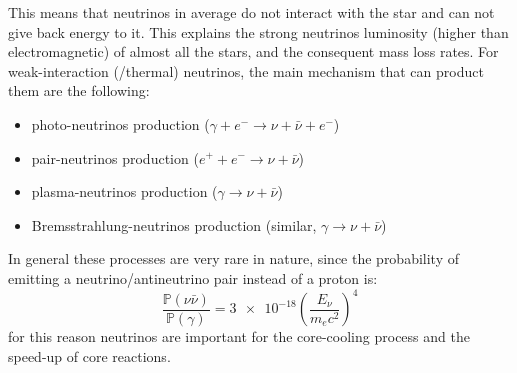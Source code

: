 \documentclass[main.tex]{subfiles}
\begin{document}
This means that neutrinos in average do not interact with the star and can not give back energy to it. This explains the strong neutrinos luminosity (higher than electromagnetic) of almost all the stars, and the consequent mass loss rates.
For weak-interaction (/thermal) neutrinos, the main mechanism that can product them are the following:
\begin{itemize}
    \item photo-neutrinos production ($\gamma+e^- \to \nu + \bar\nu +e^-$)
    \item pair-neutrinos production ($e^++e^- \to \nu + \bar\nu $)
    \item plasma-neutrinos production ($\gamma \to \nu + \bar\nu $)
    \item Bremsstrahlung-neutrinos production (similar, $\gamma \to \nu + \bar\nu $)
\end{itemize}

In general these processes are very rare in nature, since the probability of emitting a neutrino/antineutrino pair instead of a proton is:
%
\begin{equation}
    \frac{\mathbb{P}(\nu\bar\nu)}{\mathbb{P}(\gamma)}=\num{3e-18}\left(\frac{E_\nu}{m_e c^2}\right)^4
\end{equation}
%
for this reason neutrinos are important for the core-cooling process and the speed-up of core reactions.
\end{document}
